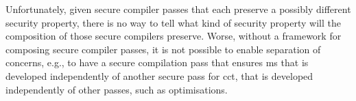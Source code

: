 \documentclass[dvipsnames]{llncs}
\begin{document}

Unfortunately, given secure compiler passes that each preserve a possibly different security property, there is no way to tell what kind of security property will the composition of those secure compilers preserve.
Worse, without a framework for composing secure compiler passes, it is not possible to enable separation of concerns, e.g., to have a secure compilation pass that ensures \gls*{ms} that is developed independently of another secure pass for \gls*{cct}, that is developed independently of other passes, such as optimisations.
\end{document}
